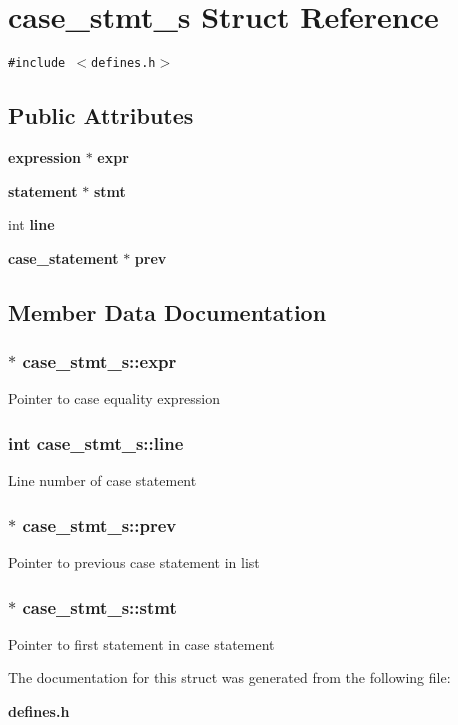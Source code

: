 \section{case\_\-stmt\_\-s  Struct Reference}
\label{structcase__stmt__s}
{\tt \#include $<$defines.h$>$}

\subsection*{Public Attributes}
\begin{CompactItemize}
\item 
{\bf expression} $\ast$ {\bf expr}
\item 
{\bf statement} $\ast$ {\bf stmt}
\item 
int {\bf line}
\item 
{\bf case\_\-statement} $\ast$ {\bf prev}
\end{CompactItemize}


\subsection{Member Data Documentation}
\subsubsection{$\ast$ case\_\-stmt\_\-s::expr}\label{structcase__stmt__s_m0}


Pointer to case equality expression 
\subsubsection{\setlength{\rightskip}{0pt plus 5cm}int case\_\-stmt\_\-s::line}\label{structcase__stmt__s_m2}


Line number of case statement 
\subsubsection{$\ast$ case\_\-stmt\_\-s::prev}\label{structcase__stmt__s_m3}


Pointer to previous case statement in list 
\subsubsection{$\ast$ case\_\-stmt\_\-s::stmt}\label{structcase__stmt__s_m1}


Pointer to first statement in case statement 

The documentation for this struct was generated from the following file:\begin{CompactItemize}
\item 
{\bf defines.h}\end{CompactItemize}
